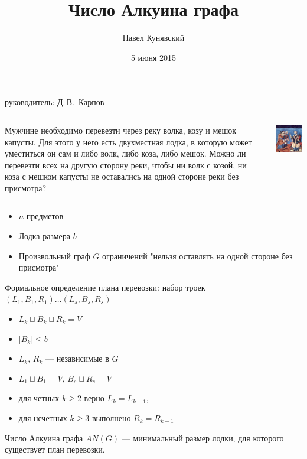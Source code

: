 \documentclass{beamer}
\title[Задача Алкуина]{Число Алкуина графа}
\author{Павел Кунявский}
\date{5 июня 2015}
\theoremstyle{definition}
\begin{document}
\begin{frame}
\titlepage
\begin{flushright}
руководитель: Д.\,В.~Карпов
\end{flushright}
\end{frame}

\begin{frame}
\begin{columns}[T] %
\begin{column}{.73\textwidth}
Мужчине необходимо перевезти через реку волка, козу и мешок капусты. Для этого у него есть
двухместная лодка, в которую может уместиться он сам и либо волк, либо коза, либо мешок.
Можно ли перевезти всех на другую сторону реки, чтобы ни волк с козой, ни коза с мешком
капусты не оставались на одной стороне реки без присмотра?
\end{column}%
\hfill%
\begin{column}{.23\textwidth}
\includegraphics[scale=0.5]{Alcuin.png}
\end{column}%
\end{columns}
\end{frame}

\begin{frame}
\begin{itemize}
\item $n$ предметов
\item Лодка размера $b$
\item Произвольный граф $G$ ограничений "нельзя оставлять на одной стороне без присмотра"
\end{itemize}
\end{frame}

\begin{frame}
Формальное определение плана перевозки: набор троек $(L_1, B_1, R_1)\dots(L_s, B_s, R_s)$
\begin{itemize}
\item $L_k \sqcup B_k \sqcup R_k = V$ 
\item $|B_k| \le b$ 
\item $L_k$, $R_k$ --- независимые в $G$
\item $L_1 \sqcup B_1 = V$, $B_s \sqcup R_s = V$
\item для четных $k \ge 2$ верно $L_k = L_{k-1}$, 
\item для нечетных $k \ge 3$ выполнено $R_k = R_{k-1}$
\end{itemize}
Число Алкуина графа $AN(G)$ --- минимальный размер лодки, для которого существует план перевозки.
\end{frame}
\end{document}
